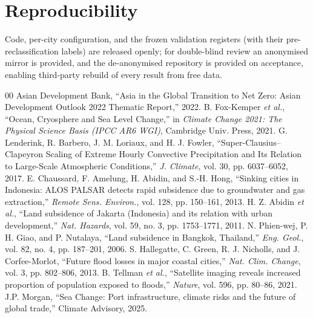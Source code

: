 \documentclass[conference]{IEEEtran}
\begin{document}
\section*{Reproducibility}
Code, per-city configuration, and the frozen validation registers (with their pre-reclassification labels) are released openly; for double-blind review an anonymised mirror is provided, and the de-anonymised repository is provided on acceptance, enabling third-party rebuild of every result from free data.

\begin{thebibliography}{00}
 Asian Development Bank, ``Asia in the Global Transition to Net Zero: Asian Development Outlook 2022 Thematic Report,'' 2022.
 B. Fox-Kemper \emph{et al.}, ``Ocean, Cryosphere and Sea Level Change,'' in \emph{Climate Change 2021: The Physical Science Basis (IPCC AR6 WGI)}, Cambridge Univ. Press, 2021.
 G. Lenderink, R. Barbero, J. M. Loriaux, and H. J. Fowler, ``Super-Clausius--Clapeyron Scaling of Extreme Hourly Convective Precipitation and Its Relation to Large-Scale Atmospheric Conditions,'' \emph{J. Climate}, vol. 30, pp. 6037--6052, 2017.
 E. Chaussard, F. Amelung, H. Abidin, and S.-H. Hong, ``Sinking cities in Indonesia: ALOS PALSAR detects rapid subsidence due to groundwater and gas extraction,'' \emph{Remote Sens. Environ.}, vol. 128, pp. 150--161, 2013.
 H. Z. Abidin \emph{et al.}, ``Land subsidence of Jakarta (Indonesia) and its relation with urban development,'' \emph{Nat. Hazards}, vol. 59, no. 3, pp. 1753--1771, 2011.
 N. Phien-wej, P. H. Giao, and P. Nutalaya, ``Land subsidence in Bangkok, Thailand,'' \emph{Eng. Geol.}, vol. 82, no. 4, pp. 187--201, 2006.
 S. Hallegatte, C. Green, R. J. Nicholls, and J. Corfee-Morlot, ``Future flood losses in major coastal cities,'' \emph{Nat. Clim. Change}, vol. 3, pp. 802--806, 2013.
 B. Tellman \emph{et al.}, ``Satellite imaging reveals increased proportion of population exposed to floods,'' \emph{Nature}, vol. 596, pp. 80--86, 2021.
 J.P. Morgan, ``Sea Change: Port infrastructure, climate risks and the future of global trade,'' Climate Advisory, 2025. %

\end{thebibliography}
\end{document}

